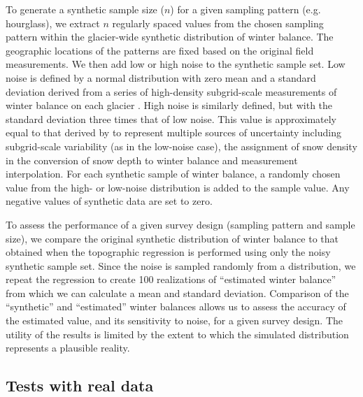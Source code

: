 \documentclass[twocolumn,letterpaper]{igs}
\begin{document}
To generate a synthetic sample size ($n$) for a given sampling pattern (e.g. hourglass), we extract $n$ regularly spaced values from the chosen sampling pattern within the glacier-wide synthetic distribution of winter balance. 
The geographic locations of the patterns are fixed based on the original field measurements.    
We then add low or high noise to the synthetic sample set. Low noise is defined by a normal distribution with zero mean and a standard deviation derived from a series of high-density subgrid-scale measurements of winter balance on each glacier \citep{Pulwicki2017}.  
High noise is similarly defined, but with the standard deviation three times that of low noise. This value is approximately equal to that derived by \citet{Pulwicki2017} to represent multiple sources of uncertainty including subgrid-scale variability (as in the low-noise case), the assignment of snow density in the conversion of snow depth to winter balance and measurement interpolation.
For each synthetic sample of winter balance, a randomly chosen value from the high- or low-noise distribution is added to the sample value. Any negative values of synthetic data are set to zero. 

To assess the performance of a given survey design (sampling pattern and sample size), we compare the original synthetic distribution of winter balance to that obtained when the topographic regression is performed using only the noisy synthetic sample set. 
Since the noise is sampled randomly from a distribution, we repeat the regression to create 100 realizations of ``estimated winter balance'' from which we can calculate a mean and standard deviation. Comparison of the ``synthetic'' and ``estimated'' winter balances allows us to assess the accuracy of the estimated value, and its sensitivity to noise, for a given survey design. 
The utility of the results is limited by the extent to which the simulated distribution represents a plausible reality.   
 
 \subsection{Tests with real data}
 
\end{document}
